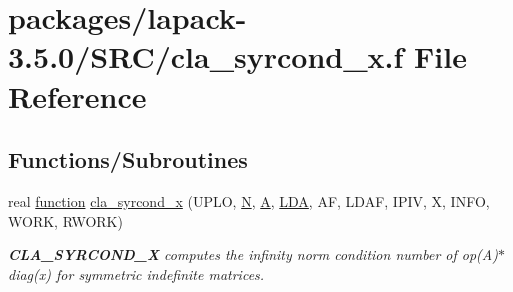 \hypertarget{cla__syrcond__x_8f}{}\section{packages/lapack-\/3.5.0/\+S\+R\+C/cla\+\_\+syrcond\+\_\+x.f File Reference}
\label{cla__syrcond__x_8f}
\subsection*{Functions/\+Subroutines}
\begin{DoxyCompactItemize}
\item 
real \hyperlink{afunc_8m_a7b5e596df91eadea6c537c0825e894a7}{function} \hyperlink{group__complexSYcomputational_ga93458339ea93230f0ad25a86910af28a}{cla\+\_\+syrcond\+\_\+x} (U\+P\+L\+O, \hyperlink{polmisc_8c_a0240ac851181b84ac374872dc5434ee4}{N}, \hyperlink{classA}{A}, \hyperlink{example__user_8c_ae946da542ce0db94dced19b2ecefd1aa}{L\+D\+A}, A\+F, L\+D\+A\+F, I\+P\+I\+V, X, I\+N\+F\+O, W\+O\+R\+K, R\+W\+O\+R\+K)
\begin{DoxyCompactList}\small\item\em {\bfseries C\+L\+A\+\_\+\+S\+Y\+R\+C\+O\+N\+D\+\_\+\+X} computes the infinity norm condition number of op(\+A)$\ast$diag(x) for symmetric indefinite matrices. \end{DoxyCompactList}\end{DoxyCompactItemize}

